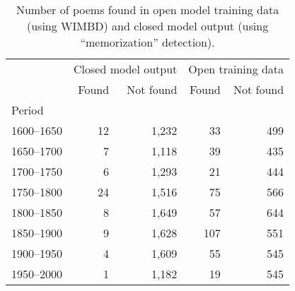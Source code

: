 \begin{table}[H]
  \centering
  \small
  \singlespacing
  \begin{tabular}{lrrrr}
  \toprule
   & \multicolumn{2}{r}{Closed model output} & \multicolumn{2}{r}{Open training data} \\
  & Found & Not found & Found & Not found \\
  Period &  &  &  &  \\
  \midrule
  1600--1650 & 12 & 1,232 & 33 & 499 \\
  1650--1700 & 7 & 1,118 & 39 & 435 \\
  1700--1750 & 6 & 1,293 & 21 & 444 \\
  1750--1800 & 24 & 1,516 & 75 & 566 \\
  1800--1850 & 8 & 1,649 & 57 & 644 \\
  1850--1900 & 9 & 1,628 & 107 & 551 \\
  1900--1950 & 4 & 1,609 & 55 & 545 \\
  1950--2000 & 1 & 1,182 & 19 & 545 \\
  \bottomrule
  \end{tabular}
  \caption{Number of poems found in open model training data (using WIMBD) and closed model output (using ``memorization'' detection).}
  \label{tab:num_poems_found_not_found}
\end{table}